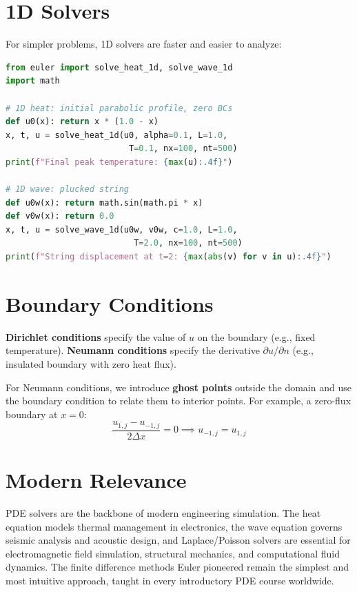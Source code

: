 \section{1D Solvers}

For simpler problems, 1D solvers are faster and easier to analyze:

\begin{lstlisting}[language=Python, caption=1D heat and wave solvers]
from euler import solve_heat_1d, solve_wave_1d
import math

# 1D heat: initial parabolic profile, zero BCs
def u0(x): return x * (1.0 - x)
x, t, u = solve_heat_1d(u0, alpha=0.1, L=1.0,
                         T=0.1, nx=100, nt=500)
print(f"Final peak temperature: {max(u):.4f}")

# 1D wave: plucked string
def u0w(x): return math.sin(math.pi * x)
def v0w(x): return 0.0
x, t, u = solve_wave_1d(u0w, v0w, c=1.0, L=1.0,
                          T=2.0, nx=100, nt=500)
print(f"String displacement at t=2: {max(abs(v) for v in u):.4f}")
\end{lstlisting}

\section{Boundary Conditions}

\textbf{Dirichlet conditions} specify the value of $u$ on the boundary (e.g., fixed temperature).
\textbf{Neumann conditions} specify the derivative $\partial u/\partial n$ (e.g., insulated boundary
with zero heat flux).

For Neumann conditions, we introduce \textbf{ghost points} outside the domain and use the
boundary condition to relate them to interior points. For example, a zero-flux boundary at $x=0$:
\[
\frac{u_{1,j} - u_{-1,j}}{2\Delta x} = 0 \implies u_{-1,j} = u_{1,j}
\]

\section{Modern Relevance}

PDE solvers are the backbone of modern engineering simulation. The heat equation models thermal
management in electronics, the wave equation governs seismic analysis and acoustic design, and
Laplace/Poisson solvers are essential for electromagnetic field simulation, structural mechanics,
and computational fluid dynamics. The finite difference methods Euler pioneered remain the simplest
and most intuitive approach, taught in every introductory PDE course worldwide.

